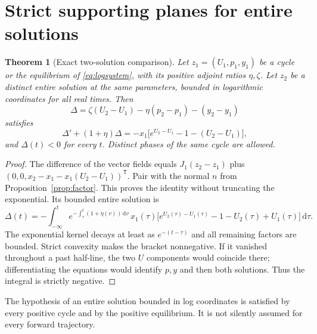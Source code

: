 \documentclass[11pt,a4paper]{article}
\numberwithin{equation}{section}
\newtheorem{theorem}{Theorem}[section]
\theoremstyle{remark}\newtheorem{remark}[theorem]{Remark}
\begin{document}
\section{Strict supporting planes for entire solutions}\label{sec:support}
\begin{theorem}[Exact two-solution comparison]\label{thm:support}
Let $z_1=(U_1,p_1,y_1)$ be a cycle or the equilibrium of \eqref{eq:logsystem}, with its positive adjoint ratios $\eta,\zeta$. Let $z_2$ be a distinct entire solution at the same parameters, bounded in logarithmic coordinates for all real times. Then
\begin{equation}\label{eq:delta}
\Delta=\zeta(U_2-U_1)-\eta(p_2-p_1)-(y_2-y_1)
\end{equation}
satisfies
\begin{equation}\label{eq:supportidentity}
\Delta'+(1+\eta)\Delta=-x_1\bigl[e^{U_2-U_1}-1-(U_2-U_1)\bigr],
\end{equation}
and $\Delta(t)<0$ for every $t$. Distinct phases of the same cycle are allowed.
\end{theorem}
\begin{proof}
The difference of the vector fields equals $J_1(z_2-z_1)$ plus
$(0,0,x_2-x_1-x_1(U_2-U_1))^{\mathsf T}$. Pair with the normal $n$ from Proposition~\ref{prop:factor}. This proves the identity without truncating the exponential. Its bounded entire solution is
\[
\Delta(t)=-\int_{-\infty}^t
 e^{-\int_\tau^t(1+\eta(v))\,\mathrm dv}\,
 x_1(\tau)\bigl[e^{U_2(\tau)-U_1(\tau)}-1-U_2(\tau)+U_1(\tau)\bigr]\,\mathrm d\tau.
\]
The exponential kernel decays at least as $e^{-(t-\tau)}$ and all remaining factors are bounded. Strict convexity makes the bracket nonnegative. If it vanished throughout a past half-line, the two $U$ components would coincide there; differentiating the equations would identify $p,y$ and then both solutions. Thus the integral is strictly negative.
\end{proof}
The hypothesis of an entire solution bounded in log coordinates is satisfied by every positive cycle and by the positive equilibrium. It is not silently assumed for every forward trajectory.
\end{document}
